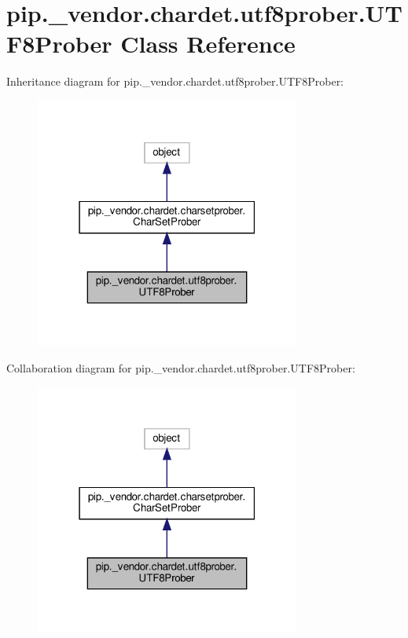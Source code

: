 \hypertarget{classpip_1_1__vendor_1_1chardet_1_1utf8prober_1_1UTF8Prober}{}\section{pip.\+\_\+vendor.\+chardet.\+utf8prober.\+U\+T\+F8\+Prober Class Reference}
\label{classpip_1_1__vendor_1_1chardet_1_1utf8prober_1_1UTF8Prober}


Inheritance diagram for pip.\+\_\+vendor.\+chardet.\+utf8prober.\+U\+T\+F8\+Prober\+:
\nopagebreak
\begin{figure}[H]
\begin{center}
\leavevmode
\includegraphics[width=247pt]{classpip_1_1__vendor_1_1chardet_1_1utf8prober_1_1UTF8Prober__inherit__graph}
\end{center}
\end{figure}


Collaboration diagram for pip.\+\_\+vendor.\+chardet.\+utf8prober.\+U\+T\+F8\+Prober\+:
\nopagebreak
\begin{figure}[H]
\begin{center}
\leavevmode
\includegraphics[width=247pt]{classpip_1_1__vendor_1_1chardet_1_1utf8prober_1_1UTF8Prober__coll__graph}
\end{center}
\end{figure}
